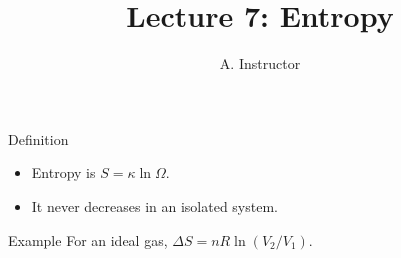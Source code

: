 \documentclass{beamer}
\title{Lecture 7: Entropy}
\author{A. Instructor}
\begin{document}
\frame{\titlepage}
\begin{frame}{Definition}
\begin{itemize}
\item Entropy is $S = \kappa \ln \Omega$.
\item<2-> It never decreases in an isolated system.
\end{itemize}
\end{frame}
\begin{frame}{Example}
For an ideal gas, $\Delta S = n R \ln(V_2/V_1)$.
\end{frame}
\end{document}
